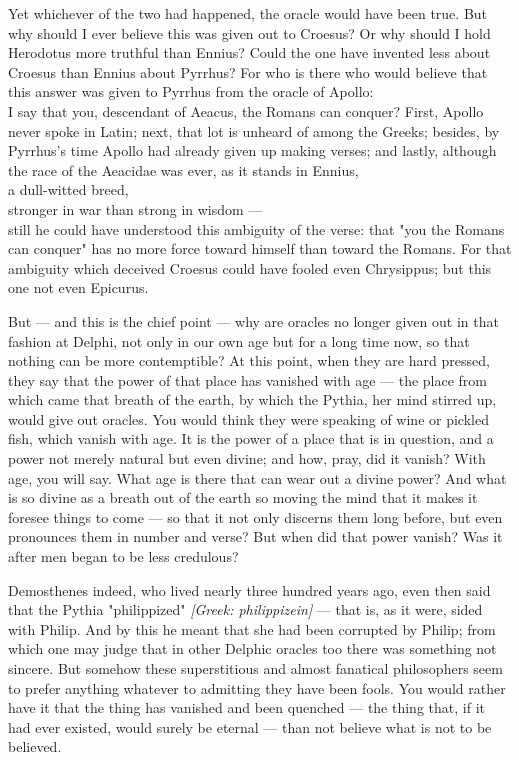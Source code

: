  Yet whichever of the two had happened, the oracle would have been true. But why should I ever believe this was given out to Croesus? Or why should I hold Herodotus more truthful than Ennius? Could the one have invented less about Croesus than Ennius about Pyrrhus? For who is there who would believe that this answer was given to Pyrrhus from the oracle of Apollo: \\ I say that you, descendant of Aeacus, the Romans can conquer? First, Apollo never spoke in Latin; next, that lot is unheard of among the Greeks; besides, by Pyrrhus's time Apollo had already given up making verses; and lastly, although the race of the Aeacidae was ever, as it stands in Ennius, \\ a dull-witted breed, \\ stronger in war than strong in wisdom — \\ still he could have understood this ambiguity of the verse: that "you the Romans can conquer" has no more force toward himself than toward the Romans. For that ambiguity which deceived Croesus could have fooled even Chrysippus; but this one not even Epicurus.

 But — and this is the chief point — why are oracles no longer given out in that fashion at Delphi, not only in our own age but for a long time now, so that nothing can be more contemptible? At this point, when they are hard pressed, they say that the power of that place has vanished with age — the place from which came that breath of the earth, by which the Pythia, her mind stirred up, would give out oracles. You would think they were speaking of wine or pickled fish, which vanish with age. It is the power of a place that is in question, and a power not merely natural but even divine; and how, pray, did it vanish? With age, you will say. What age is there that can wear out a divine power? And what is so divine as a breath out of the earth so moving the mind that it makes it foresee things to come — so that it not only discerns them long before, but even pronounces them in number and verse? But when did that power vanish? Was it after men began to be less credulous?

 Demosthenes indeed, who lived nearly three hundred years ago, even then said that the Pythia "philippized" \textit{[Greek: philippizein]} — that is, as it were, sided with Philip. And by this he meant that she had been corrupted by Philip; from which one may judge that in other Delphic oracles too there was something not sincere. But somehow these superstitious and almost fanatical philosophers seem to prefer anything whatever to admitting they have been fools. You would rather have it that the thing has vanished and been quenched — the thing that, if it had ever existed, would surely be eternal — than not believe what is not to be believed.

